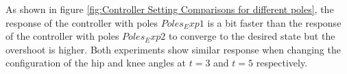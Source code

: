 As shown in figure \ref{fig:Controller Setting Comparisons for different poles}, the response of the controller with poles $Poles_Exp1$ is a bit faster than the response of the controller with poles $Poles_Exp2$ to converge to the desired state but the overshoot is higher. Both experiments show similar response when changing the configuration of the hip and knee angles at $t=3$ and $t=5$ respectively.









	


